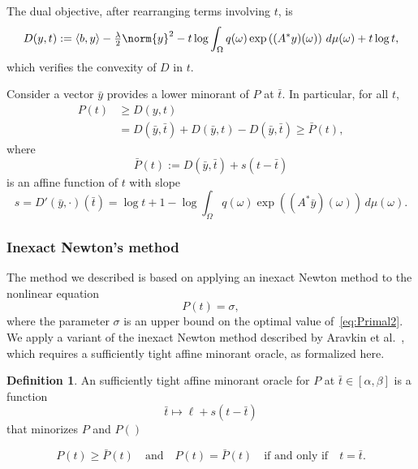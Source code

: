 \documentclass[10pt,a4paper]{article}
\numberwithin{equation}{section}
\theoremstyle{definition}
\newtheorem{definition}[theorem]{Definition}
\newcommand{\ip}[1]{\langle#1\rangle}
\begin{document}
The dual objective, after rearranging terms involving $t$, is
\[
  D(y,t) := \ip{b,y} - \tfrac{\lambda}{2}\norm{y}^2 - t\log\int_\Omega q(\omega)\exp\left((A^*y)(\omega)\right) \,d\mu(\omega) + t\log t,
\]
which verifies the convexity of $D$ in $t$.

Consider a vector $\bar y$ provides a lower minorant of $P$ at $\bar t$. In particular, for all $t$,
\begin{align}
P(t) &\ge D(y,t)\\
     &= D(\bar y, \bar t) + D(\bar y, t) - D(\bar y, \bar t)
     \ge \bar P(t),
\end{align}
where
\begin{equation}\label{eq:minorant}
    \bar P(t) := D(\bar y, \bar t) + s(t-\bar t)
\end{equation}
is an affine function of $t$ with slope
$$s = D'(\bar y, \cdot)(\bar t) = \log t + 1 - \log\int_\Omega q(\omega)\exp((A^*\bar y)(\omega))\,d\mu(\omega).$$

\subsubsection{Inexact Newton's method}

The method we described is based on applying an inexact Newton method to the nonlinear equation
\begin{equation}\label{eq:Newton-equation}
    P(t) = \sigma,
\end{equation}
where the parameter $\sigma$ is an upper bound on the optimal value of~\eqref{eq:Primal2}.  We apply a variant of the inexact Newton method described by Aravkin et al.~\cite[Section~2.2]{aravkin_LevelsetMethodsConvex_2019}, which requires a sufficiently tight affine minorant oracle, as formalized here.

\begin{definition}\label{def:minorant-oracle}
    An sufficiently tight affine minorant oracle for $P$ at $\bar t\in[\alpha, \beta]$ is a function
    \begin{equation}
        \bar t \mapsto \ell + s(t - \bar t)
    \end{equation}
    that minorizes $P$ and $P()$

    \begin{equation}\label{eq:minorant-oracle}
        P(t) \ge \bar P(t) \quad \text{and} \quad P(t) = \bar P(t) \quad \text{if and only if} \quad t = \bar t.
    \end{equation}
\end{definition}
\end{document}

